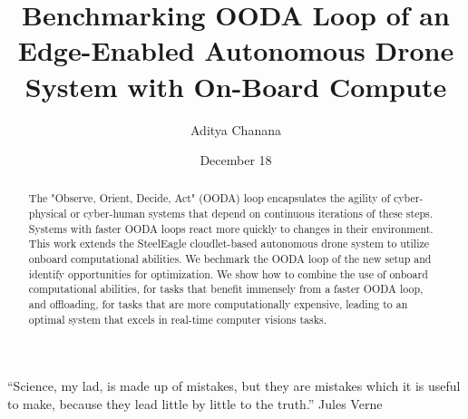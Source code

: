 \documentclass[12pt]{cmuthesis}
\begin{document}
\frontmatter

\pagestyle{empty}

\title{ %
{\bf Benchmarking OODA Loop of an Edge-Enabled Autonomous Drone System with On-Board Compute}}
\author{Aditya Chanana}
\date{December 18}
\trnumber{}


\support{}
\disclaimer{}



\maketitle

\begin{dedication}
“Science, my lad, is made up of mistakes, but they are mistakes which it is useful to make, because they lead little by little to the truth.” Jules Verne
\end{dedication}

\pagestyle{plain} %


\begin{abstract}

    The "Observe, Orient, Decide, Act" (OODA) loop encapsulates the agility of
    cyber-physical or cyber-human systems that depend on continuous iterations
    of these steps. Systems with faster OODA loops react more quickly to
    changes in their environment. This work extends the SteelEagle
    cloudlet-based autonomous drone system to utilize onboard computational
    abilities. We bechmark the OODA loop of the new setup and identify
    opportunities for optimization. We show how to combine the use of onboard
    computational abilities, for tasks that benefit immensely from a faster OODA loop,
    and offloading, for tasks that are more computationally expensive, leading
    to an optimal system that excels in real-time computer visions tasks.

\end{abstract}
\end{document}
